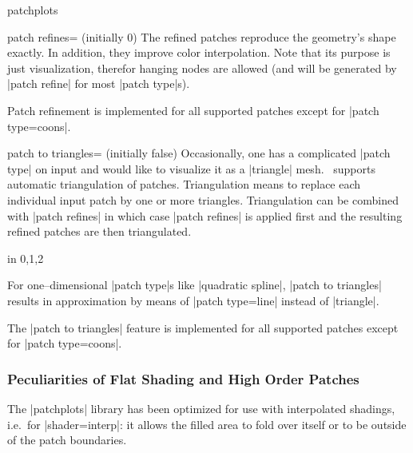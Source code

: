 \begin{pgfplotslibrary}{patchplots}
\begin{pgfplotskey}{patch refines= (initially 0)}
	The refined patches reproduce the geometry's shape exactly. In addition, they improve color interpolation. Note that its purpose is just visualization, therefor hanging nodes are allowed (and will be generated by |patch refine| for most |patch type|s).

	Patch refinement is implemented for all supported patches except for |patch type=coons|.
\end{pgfplotskey}

\begin{pgfplotskey}{patch to triangles= (initially false)}
	Occasionally, one has a complicated |patch type| on input and would like to visualize it as a |triangle| mesh. \PGFPlots\ supports automatic triangulation of patches. Triangulation means to replace each individual input patch by one or more triangles. Triangulation can be combined with |patch refines| in which case |patch refines| is applied first and the resulting refined patches are then triangulated.
\begin{codeexample}[]
\foreach \level in {0,1,2} {%
}
\end{codeexample}
	
	For one--dimensional |patch type|s like |quadratic spline|, |patch to triangles| results in approximation by means of |patch type=line| instead of |triangle|. 

	The |patch to triangles| feature is implemented for all supported patches except for |patch type=coons|.
\end{pgfplotskey}

\subsubsection{Peculiarities of Flat Shading and High Order Patches}
\label{sec:lib:patchplots:flat}
The |patchplots| library has been optimized for use with interpolated shadings, i.e.\ for |shader=interp|: it allows the filled area to fold over itself or to be outside of the patch boundaries.


\end{pgfplotslibrary}
